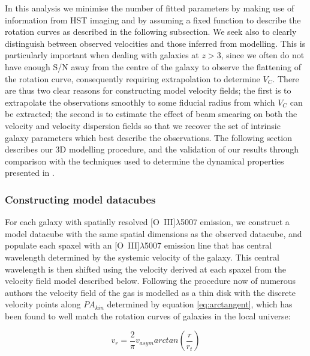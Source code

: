 \documentclass[fleqn,usenatbib]{mn2e}
\begin{document}
In this analysis we minimise the number of fitted parameters by making use of information from HST imaging and by assuming a fixed function to describe the rotation curves as described in the following subsection.    
We seek also to clearly distinguish between observed velocities and those inferred from modelling.
This is particularly important when dealing with galaxies at $z > 3$, since we often do not have enough S/N away from the centre of the galaxy to observe the flattening of the rotation curve, consequently requiring extrapolation to determine $V_{C}$.  
There are thus two clear reasons for constructing model velocity fields; the first is to extrapolate the observations smoothly to some fiducial radius from which $V_{C}$ can be extracted; the second is to estimate the effect of beam smearing on both the velocity and velocity dispersion fields so that we recover the set of intrinsic galaxy parameters which best describe the observations.
The following section describes our 3D modelling procedure, and the validation of our results through comparison with the techniques used to determine the dynamical properties presented in \cite{Harrison2017}.

\subsubsection{Constructing model datacubes}\label{subsubec:model_cube}
For each galaxy with spatially resolved [O~{\sc III}]$\lambda$5007 emission, we construct a model datacube with the same spatial dimensions as the observed datacube, and populate each spaxel with an [O~{\sc III}]$\lambda$5007 emission line that has central wavelength determined by the systemic velocity of the galaxy.
This central wavelength is then shifted using the velocity derived at each spaxel from the velocity field model described below.  
Following the procedure now of numerous authors \citep[e.g.][]{Epinat2010,Epinat2012,Swinbank2012,Stott2016,Mason2016} the velocity field of the gas is modelled as a thin disk with the discrete velocity points along $PA_{kin}$ determined by equation \ref{eq:arctangent}, which has been found to well match the rotation curves of galaxies in the local universe:

\begin{equation}\label{eq:arctangent}
   v_{r} = \frac{2}{\pi}v_{asym}arctan\left(\frac{r}{r_{t}}\right)
\end{equation}
\end{document}
